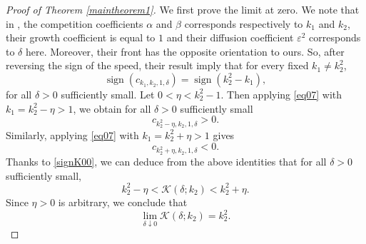 \documentclass[11pt]{article}
\numberwithin{equation}{section}
\newcommand{\1}{\mathbbm{1}}
\numberwithin{equation}{section}
\theoremstyle{definition}
\newcommand{\sgn}{\operatorname{sign}}
\def \K {\mathcal{K}}
\numberwithin{equation}{section}
\begin{document}
\begin{proof}[Proof of Theorem \ref{maintheorem1}]
We first prove the limit at zero. We note that in \cite[Theorem 23 and Remark 24]{alzahrani2010}, the competition coefficients $\alpha$ and $\beta$ corresponds respectively to $k_1$ and $k_2$, their growth coefficient is equal to $1$ and their diffusion coefficient  $\varepsilon^2$ corresponds to $\delta$ here. Moreover, their front has the opposite orientation to ours. So, after reversing the sign of the speed, their result imply that  for every fixed $k_1\neq k_2^2$,
\begin{equation}\label{eq07}
	\sgn(c_{k_1,k_2,1,\delta})=\sgn(k_2^2-k_1),
\end{equation}
for all $\delta>0$ sufficiently small. Let $0<\eta<k_2^2-1$. Then applying \eqref{eq07} with $k_1=k_2^2-\eta>1$, we obtain  for all $\delta>0$ sufficiently small
\begin{equation*}
c_{k_2^2-\eta,k_2,1,\delta}>0.
\end{equation*}
Similarly, applying \eqref{eq07} with $k_1=k_2^2+\eta>1$ gives
\begin{equation*}
	c_{k_2^2+\eta,k_2,1,\delta}<0.
\end{equation*}
Thanks to \eqref{signK00}, we can deduce from the above identities that for all $\delta>0$ sufficiently small,
\begin{equation*}
k_2^2-\eta<\K(\delta;k_2)<k_2^2+\eta.
\end{equation*}
Since $\eta>0$ is arbitrary, we conclude that
\begin{equation}\label{ewen}
	\lim_{\delta\downarrow0}\K(\delta;k_2)=k_2^2.
\end{equation}


\end{proof}
\end{document}
